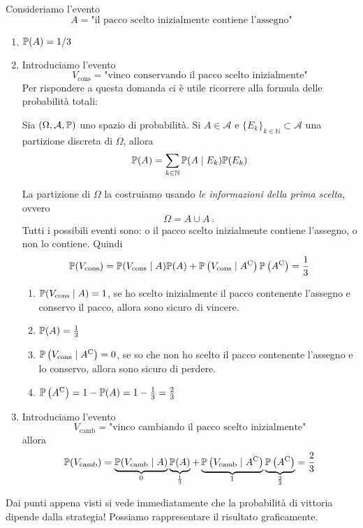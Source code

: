 Consideriamo l'evento
\begin{equation*}
	A=\text{"il pacco scelto inizialmente contiene l'assegno"}
\end{equation*}
\begin{enumerate}
	\item $\mathbb{P}( A) =1/3$
	\item Introduciamo l'evento
	\begin{equation*}
		V_{\text{cons}} =\text{"vinco conservando il pacco scelto inizialmente"}
	\end{equation*}
	Per rispondere a questa domanda ci è utile ricorrere alla formula delle probabilità totali:
	\begin{theorem}
		Sia $( \Omega ,\mathcal{A} ,\mathbb{P})$ uno spazio di probabilità. Si $A\in \mathcal{A}$ e $\{E_{k}\}_{k\in \mathbb{N}} \subset \mathcal{A}$ una partizione discreta di $\Omega $, allora
		\begin{equation*}
			\mathbb{P}( A) =\sum\limits _{k\in \mathbb{N}}\mathbb{P}( A\mid E_{k})\mathbb{P}( E_{k})
		\end{equation*}
	\end{theorem}
	La partizione di $\Omega $ la costruiamo usando \textit{le informazioni della prima scelta}, ovvero
	\begin{equation*}
		\Omega =A\cup A\comp
	\end{equation*}
	Tutti i possibili eventi sono: o il pacco scelto inizialmente contiene l'assegno, o non lo contiene. Quindi
	\begin{equation*}
		\mathbb{P}( V_{\text{cons}}) =\mathbb{P}( V_{\text{cons}} \mid A)\mathbb{P}( A) +\mathbb{P}\left( V_{\text{cons}} \mid A^{\mathrm{C}}\right)\mathbb{P}\left( A^{\mathrm{C}}\right) =\frac{1}{3}
	\end{equation*}
	\begin{enumerate}
		\item $\mathbb{P}( V_{\text{cons}} \mid A) =1$, se ho scelto inizialmente il pacco contenente l'assegno e conservo il pacco, allora sono sicuro di vincere.
		\item $\mathbb{P}( A) =\frac{1}{3}$
		\item $\mathbb{P}\left( V_{\text{cons}} \mid A^{\mathrm{C}}\right) =0$, se so che non ho scelto il pacco contenente l'assegno e lo conservo, allora sono sicuro di perdere.
		\item $\mathbb{P}\left( A^{\mathrm{C}}\right) =1-\mathbb{P}( A) =1-\frac{1}{3} =\frac{2}{3}$
	\end{enumerate}
	\item Introduciamo l'evento
	\begin{equation*}
		V_{\text{camb}} =\text{"vinco cambiando il pacco scelto inizialmente"}
	\end{equation*}
	allora
	\begin{equation*}
		\mathbb{P}( V_{\text{camb}}) =\underbrace{\mathbb{P}( V_{\text{camb}} \mid A)}_{0}\underbrace{\mathbb{P}( A)}_{\frac{1}{3}} +\underbrace{\mathbb{P}\left( V_{\text{camb}} \mid A^{\mathrm{C}}\right)}_{1}\underbrace{\mathbb{P}\left( A^{\mathrm{C}}\right)}_{\frac{2}{3}} =\frac{2}{3}
	\end{equation*}
\end{enumerate}
Dai punti appena visti si vede immediatamente che la probabilità di vittoria dipende dalla strategia! Possiamo rappresentare il risultato graficamente.

